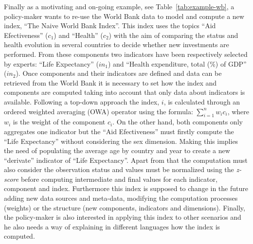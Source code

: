 Finally as a motivating and on-going example, see Table~\ref{tab:example-wb}, a policy-maker wants to re-use the World Bank data to model and compute a new index, ``The Naive World Bank Index''. This 
index uses the topics ``Aid Efectiveness'' ($c_1$) and ``Health'' ($c_2$) with the aim of comparing the status and health evolution in several countries to decide whether new 
investments are performed. From these components two indicators have been respectively selected by experts: ``Life Expectancy'' ($in_1$) and ``Health expenditure, total (\%) of GDP'' ($in_2$). 
Once components and their indicators are defined and data can be retrieved from the World Bank it is necessary to set how the index and components are computed 
taking into account that only data about indicators is available. Following a top-down approach the index, $i$, is calculated through an ordered weighted averaging (OWA) operator using the 
formula: $\sum_{i=1}^n  w_i c_i$, where $w_i$ is the weight of the component $c_i$. On the other hand, both components only aggregates one indicator but the ``Aid Efectiveness'' 
must firstly compute the ``Life Expectancy'' without considering the sex dimension. Making this implies the need of populating the average age by country and year to create 
a new ``derivate'' indicator of ``Life Expectancy''. Apart from that the computation must also consider the observation status and values must be normalized using the 
\textit{z-score} before computing intermediate and final values for each indicator, component and index. Furthermore this index is supposed to change in the future 
adding new data sources and meta-data, modifying the computation processes (weights) or the structure (new components, indicators and dimensions). Finally, the policy-maker 
is also interested in applying this index to other scenarios and he also needs a way of explaining in different languages how the index is computed. 



